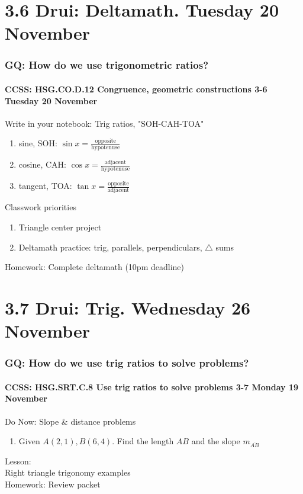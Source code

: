 \documentclass{beamer}
\begin{document}
    \section{3.6 Drui: Deltamath. Tuesday 20 November}
      \frame
      {
        \frametitle{GQ: How do we use trigonometric ratios?}
        \framesubtitle{CCSS: HSG.CO.D.12 Congruence, geometric constructions  \alert{3-6 Tuesday 20 November}}

        \begin{block}{Write in your notebook: Trig ratios, "SOH-CAH-TOA"}
        \begin{enumerate}
            \item sine, SOH: $\displaystyle \sin x = \frac{\text{opposite}} {\text{hypotenuse}}$
            \item cosine, CAH: $\displaystyle \cos x = \frac{\text{adjacent}} {\text{hypotenuse}}$
            \item tangent, TOA: $\displaystyle \tan x = \frac{\text{opposite}} {\text{adjacent}}$
        \end{enumerate}
        \end{block}
        Classwork priorities
        \begin{enumerate}
            \item  Triangle center project
            \item  Deltamath practice: trig, parallels, perpendiculars, $\triangle$ sums
        \end{enumerate}
        Homework: Complete deltamath (10pm deadline)
      }


    \section{3.7 Drui: Trig. Wednesday 26 November}
      \frame
      {
        \frametitle{GQ: How do we use trig ratios to solve problems?}
        \framesubtitle{CCSS: HSG.SRT.C.8 Use trig ratios to solve problems  \alert{3-7 Monday 19 November}}

        \begin{block}{Do Now: Slope \& distance problems}
          \begin{enumerate}
            \item Given $A(2,1),B(6,4)$. Find the length $AB$ and the slope $m_{\overline{AB}}$
          \end{enumerate}
        \end{block}
        Lesson: \\
        Right triangle trigonomy examples\\[0.5cm]
        Homework: Review packet
      }
\end{document}
